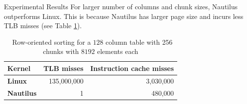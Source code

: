 \begin{block}{Experimental Results}
  For larger number of columns and chunk sizes, Nautilus outperforms Linux. This is because Nautilus has larger page size and incurs less TLB misses (see Table \ref{table:cache_miss}).

    \begin{table}
      \bgroup
      \def\arraystretch{1.3}%
      \setlength\tabcolsep{1cm}
      \begin{tabular}{l || r | r }
        \textbf{Kernel}    & TLB misses  & Instruction cache misses \\
        \hline\hline
        \textbf{Linux}     & 135,000,000 & 3,030,000 \\
         \textbf{Nautilus} &           1 &   480,000 \\
      \end{tabular}
\egroup
      \label{table:cache_miss}
      \caption{~Row-oriented sorting for a $128$ column table with 256 chunks with $8192$ elements each}
    \end{table}
  

\end{block}
